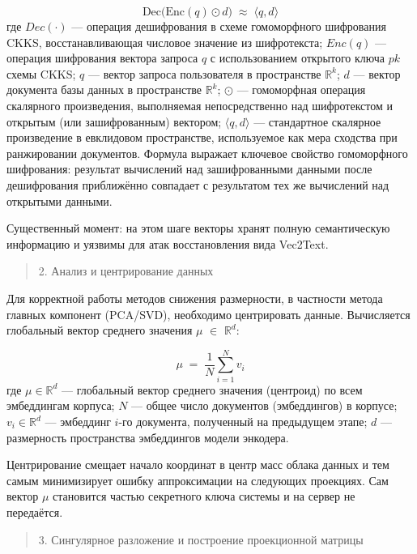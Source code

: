 \documentclass[a4paper, 12pt, oneside, openany]{article}
\begin{document}
\begin{equation}
	\mathrm{Dec}\bigl( \mathrm{Enc}(q) \odot d \bigr) \;\approx\; \langle q, d \rangle
	\label{eq:4-2}
\end{equation}
где \(Dec( \cdot )\) --- операция дешифрования в схеме гомоморфного шифрования CKKS, восстанавливающая числовое значение из шифротекста; \(Enc(q)\) --- операция шифрования вектора запроса \(q\) с использованием открытого ключа \(pk\) схемы CKKS; \(q\) --- вектор запроса пользователя в пространстве \(\mathbb{R}^{k}\); \(d\) --- вектор документа базы данных в пространстве \(\mathbb{R}^{k}\); \(\odot\) --- гомоморфная операция скалярного произведения, выполняемая непосредственно над шифротекстом и открытым (или зашифрованным) вектором; \(\langle q,d\rangle\) --- стандартное скалярное произведение в евклидовом пространстве, используемое как мера сходства при ранжировании документов. Формула выражает ключевое свойство гомоморфного шифрования: результат вычислений над зашифрованными данными после дешифрования приближённо совпадает с результатом тех же вычислений над открытыми данными.

Существенный момент: на этом шаге векторы хранят полную семантическую информацию и уязвимы для атак восстановления вида Vec2Text.

\begin{quote}
	2. Анализ и центрирование данных
\end{quote}

Для корректной работы методов снижения размерности, в частности метода главных компонент (PCA/SVD), необходимо центрировать данные. Вычисляется глобальный вектор среднего значения $\mu$ $\in$ \(\mathbb{R}^{d}\):

\begin{equation}
	\mu \;=\; \frac{1}{N} \sum_{i = 1}^{N} v_{i}
	\label{eq:4-3}
\end{equation}
где \(\mu \in \mathbb{R}^{d}\) --- глобальный вектор среднего значения (центроид) по всем эмбеддингам корпуса; \(N\) --- общее число документов (эмбеддингов) в корпусе; \(v_{i} \in \mathbb{R}^{d}\) --- эмбеддинг \(i\)-го документа, полученный на предыдущем этапе; \(d\) --- размерность пространства эмбеддингов модели энкодера.

Центрирование смещает начало координат в центр масс облака данных и тем самым минимизирует ошибку аппроксимации на следующих проекциях. Сам вектор $\mu$ становится частью секретного ключа системы и на сервер не передаётся.

\begin{quote}
	3. Сингулярное разложение и построение проекционной матрицы
\end{quote}
\end{document}
